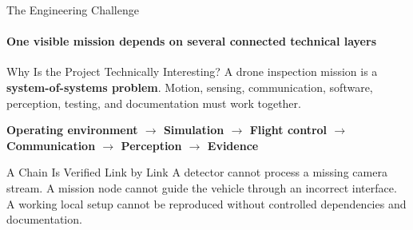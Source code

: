 \begin{frame}{The Engineering Challenge}
\framesubtitle{One visible mission depends on several connected technical layers}
\footnotesize
\begin{block}{Why Is the Project Technically Interesting?}
A drone inspection mission is a \textbf{system-of-systems problem}. Motion, sensing, communication, software, perception, testing, and documentation must work together.
\end{block}
\begin{center}
\textbf{
Operating environment
$\rightarrow$
Simulation
$\rightarrow$
Flight control
$\rightarrow$
Communication
$\rightarrow$
Perception
$\rightarrow$
Evidence
}
\end{center}
\pause
\begin{alertblock}{A Chain Is Verified Link by Link}
A detector cannot process a missing camera stream. A mission node cannot guide the vehicle through an incorrect interface. A working local setup cannot be reproduced without controlled dependencies and documentation.
\end{alertblock}
\end{frame}







